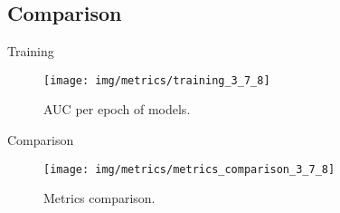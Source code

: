 \documentclass[10pt]{beamer}
\newcommand{\1}{
	\setbeamertemplate{background}{
		\texttt{[image: img/1]}
		\tikz[overlay] \fill[fill opacity=0.75,fill=white] (0,0) rectangle (-\paperwidth,\paperheight);
	}
}
\begin{document}
\subsection{Comparison}

\begin{frame}{Training}{}

	\begin{figure}[H]
		\centering
		\texttt{[image: img/metrics/training\_3\_7\_8]}	
		\caption{AUC per epoch of models.}		
	\end{figure}
\end{frame}

\begin{frame}{Comparison}{}

	\begin{figure}[H]
		\centering
		\texttt{[image: img/metrics/metrics\_comparison\_3\_7\_8]}	
		\caption{Metrics comparison.}		
	\end{figure}
\end{frame}
\end{document}
